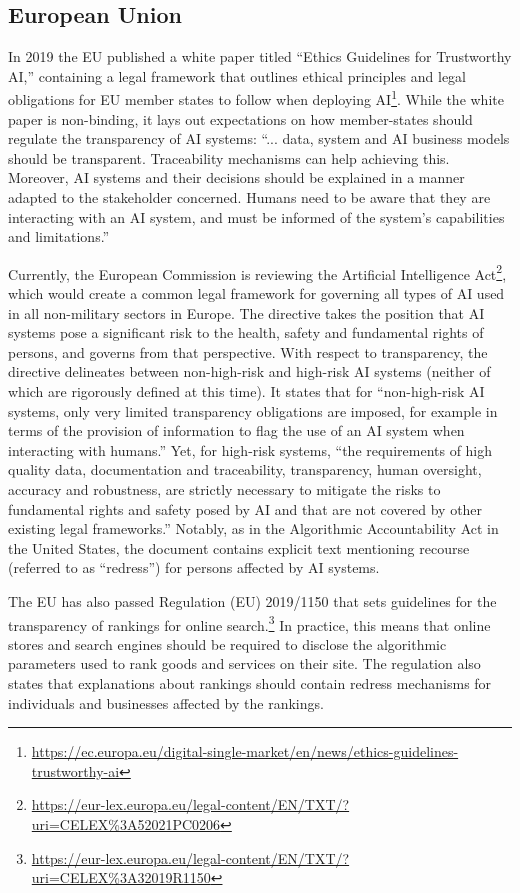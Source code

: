\documentclass[sigconf, nonacm]{acmart}
\begin{document}
\subsection{European Union}

In 2019 the EU published a white paper titled ``Ethics Guidelines for Trustworthy AI,'' containing a legal framework that outlines ethical principles and legal obligations for EU member states to follow when deploying AI\footnote{\url{https://ec.europa.eu/digital-single-market/en/news/ethics-guidelines-trustworthy-ai}}. While the white paper is non-binding, it lays out expectations on how member-states should regulate the transparency of AI systems: ``... data, system and AI business models should be transparent. Traceability mechanisms can help achieving this. Moreover, AI systems and their decisions should be explained in a manner adapted to the stakeholder concerned. Humans need to be aware that they are interacting with an AI system, and must be informed of the system’s capabilities and limitations.''

Currently, the European Commission is reviewing the Artificial Intelligence Act\footnote{\url{https://eur-lex.europa.eu/legal-content/EN/TXT/?uri=CELEX\%3A52021PC0206}}, which would create a common legal framework for governing all types of AI used in all non-military sectors in Europe. The directive takes the position that AI systems pose a significant risk to the health, safety and fundamental rights of persons, and governs from that perspective. With respect to transparency, the directive delineates between non-high-risk and high-risk AI systems (neither of which are rigorously defined at this time). It states that for ``non-high-risk AI systems, only very limited transparency obligations are imposed, for example in terms of the provision of information to flag the use of an AI system when interacting with humans.'' Yet, for high-risk systems, ``the requirements of high quality data, documentation and traceability, transparency, human oversight, accuracy and robustness, are strictly necessary to mitigate the risks to fundamental rights and safety posed by AI and that are not covered by other existing legal frameworks.'' Notably, as in the Algorithmic Accountability Act in the United States, the document contains explicit text mentioning recourse (referred to as ``redress'') for persons affected by AI systems.

The EU has also passed Regulation (EU) 2019/1150 that sets guidelines for the transparency of rankings for online search.\footnote{\url{https://eur-lex.europa.eu/legal-content/EN/TXT/?uri=CELEX\%3A32019R1150}} In practice, this means that online stores and search engines should be required to disclose the algorithmic parameters used to rank goods and services on their site. The regulation also states that explanations about rankings should contain redress mechanisms for individuals and businesses affected by the rankings.
\end{document}
